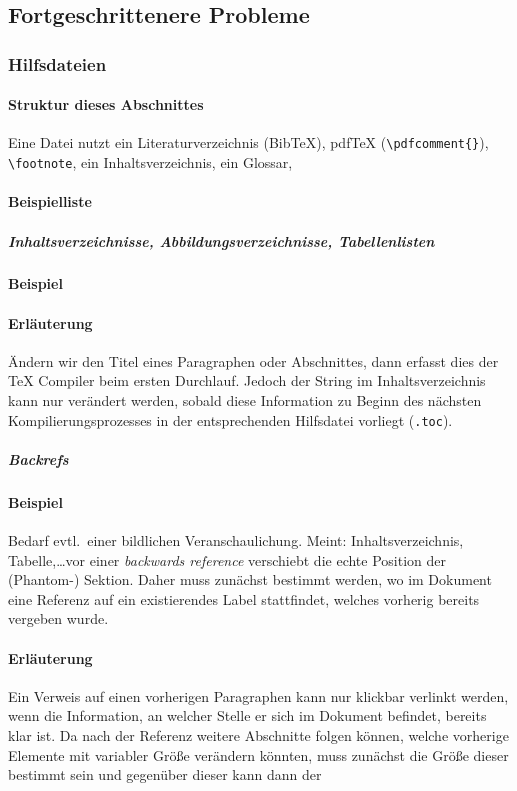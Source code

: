 \subsection{Fortgeschrittenere Probleme}\label{problems:advanced}
\subsubsection{Hilfsdateien}%
\paragraph{Struktur dieses Abschnittes}
Eine Datei nutzt ein Literaturverzeichnis (Bib\TeX{}), pdf\TeX{} (\verb|\pdfcomment{}|), \verb|\footnote|, ein Inhaltsverzeichnis, ein Glossar, 

\paragraph{Beispielliste}
\subparagraph*{Inhaltsverzeichnisse, Abbildungsverzeichnisse, Tabellenlisten}
\paragraph*{Beispiel}
\paragraph*{Erläuterung}
Ändern wir den Titel eines Paragraphen oder Abschnittes, dann erfasst dies der \TeX{} Compiler beim ersten Durchlauf. Jedoch der String im Inhaltsverzeichnis kann nur verändert werden, sobald diese Information zu Beginn des nächsten Kompilierungsprozesses in der entsprechenden Hilfsdatei vorliegt (\texttt{.toc}).

\subparagraph{Backrefs}
\paragraph*{Beispiel}
Bedarf evtl.\ einer bildlichen Veranschaulichung. Meint: Inhaltsverzeichnis, Tabelle,\ldots vor einer \textit{backwards reference} verschiebt die echte Position der (Phantom-) Sektion. Daher muss zunächst bestimmt werden, wo im Dokument eine Referenz auf ein existierendes Label stattfindet, welches vorherig bereits vergeben wurde.
\paragraph*{Erläuterung}
Ein Verweis auf einen vorherigen Paragraphen kann nur klickbar verlinkt werden, wenn die Information, an welcher Stelle er sich im Dokument befindet, bereits klar ist. Da nach der Referenz weitere Abschnitte folgen können, welche vorherige Elemente mit variabler Größe verändern könnten, muss zunächst die Größe dieser bestimmt sein und gegenüber dieser kann dann der 

